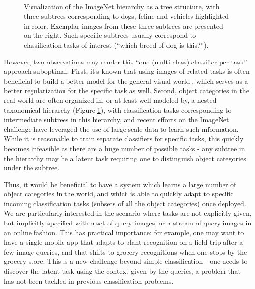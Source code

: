 \begin{figure}
\begin{minipage}{0.45\linewidth}
\begin{flushleft}
        \introsep
        \introsep
        \introsep
        \\
        \introsep
        \introsep
        \introsep
        \end{flushleft}
    \end{minipage}
    \caption{Visualization of the ImageNet hierarchy as a tree structure, with three subtrees corresponding to dogs, feline and vehicles highlighted in color. Exemplar images from these three subtrees are presented on the right. Such specific subtrees usually correspond to classification tasks of interest (``which breed of dog is this?'').}\label{fig:ilsvrc2010tree}
\end{figure}

However, two observations may render this ``one (multi-class) classifier per task'' approach suboptimal. First, it's known that using images of related tasks is often beneficial to build a better model for the general visual world \cite{raina2007self}, which serves as a better regularization for the specific task as well. Second, object categories in the real world are often organized in, or at least well modeled by, a nested taxonomical hierarchy (\eg Figure \ref{fig:ilsvrc2010tree}), with classification tasks corresponding to intermediate subtrees in this hierarchy, and recent efforts on the ImageNet challenge \cite{ilsvrc,lin2011large,sanchez2011high,krizhevsky2012imagenet} have leveraged the use of large-scale data to learn such information. While it is reasonable to train separate classifiers for specific tasks, this quickly becomes infeasible as there are a huge number of possible tasks - any subtree in the hierarchy may be a latent task requiring one to distinguish object categories under the subtree.

Thus, it would be beneficial to have a system which learns a large number of object categories in the world, and which is able to quickly adapt to specific incoming classification tasks (subsets of all the object categories) once deployed. We are particularly interested in the scenario where tasks are not explicitly given, but implicitly specified with a set of query images, or a stream of query images in an online fashion. This has practical importance: for example, one may want to have a single mobile app that adapts to plant recognition on a field trip after a few image queries, and that shifts to grocery recognitions when one stops by the grocery store. This is a new challenge beyond simple classification - one needs to discover the latent task using the context given by the queries, a problem that has not been tackled in previous classification problems.

